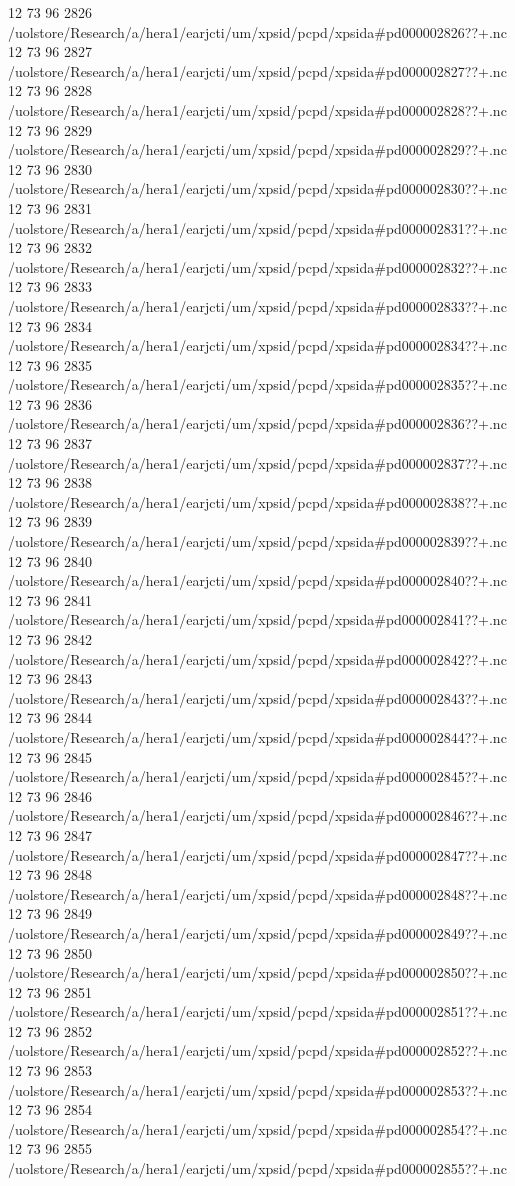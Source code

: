 12 73 96
2826
/uolstore/Research/a/hera1/earjcti/um/xpsid/pcpd/xpsida#pd000002826??+.nc
12 73 96
2827
/uolstore/Research/a/hera1/earjcti/um/xpsid/pcpd/xpsida#pd000002827??+.nc
12 73 96
2828
/uolstore/Research/a/hera1/earjcti/um/xpsid/pcpd/xpsida#pd000002828??+.nc
12 73 96
2829
/uolstore/Research/a/hera1/earjcti/um/xpsid/pcpd/xpsida#pd000002829??+.nc
12 73 96
2830
/uolstore/Research/a/hera1/earjcti/um/xpsid/pcpd/xpsida#pd000002830??+.nc
12 73 96
2831
/uolstore/Research/a/hera1/earjcti/um/xpsid/pcpd/xpsida#pd000002831??+.nc
12 73 96
2832
/uolstore/Research/a/hera1/earjcti/um/xpsid/pcpd/xpsida#pd000002832??+.nc
12 73 96
2833
/uolstore/Research/a/hera1/earjcti/um/xpsid/pcpd/xpsida#pd000002833??+.nc
12 73 96
2834
/uolstore/Research/a/hera1/earjcti/um/xpsid/pcpd/xpsida#pd000002834??+.nc
12 73 96
2835
/uolstore/Research/a/hera1/earjcti/um/xpsid/pcpd/xpsida#pd000002835??+.nc
12 73 96
2836
/uolstore/Research/a/hera1/earjcti/um/xpsid/pcpd/xpsida#pd000002836??+.nc
12 73 96
2837
/uolstore/Research/a/hera1/earjcti/um/xpsid/pcpd/xpsida#pd000002837??+.nc
12 73 96
2838
/uolstore/Research/a/hera1/earjcti/um/xpsid/pcpd/xpsida#pd000002838??+.nc
12 73 96
2839
/uolstore/Research/a/hera1/earjcti/um/xpsid/pcpd/xpsida#pd000002839??+.nc
12 73 96
2840
/uolstore/Research/a/hera1/earjcti/um/xpsid/pcpd/xpsida#pd000002840??+.nc
12 73 96
2841
/uolstore/Research/a/hera1/earjcti/um/xpsid/pcpd/xpsida#pd000002841??+.nc
12 73 96
2842
/uolstore/Research/a/hera1/earjcti/um/xpsid/pcpd/xpsida#pd000002842??+.nc
12 73 96
2843
/uolstore/Research/a/hera1/earjcti/um/xpsid/pcpd/xpsida#pd000002843??+.nc
12 73 96
2844
/uolstore/Research/a/hera1/earjcti/um/xpsid/pcpd/xpsida#pd000002844??+.nc
12 73 96
2845
/uolstore/Research/a/hera1/earjcti/um/xpsid/pcpd/xpsida#pd000002845??+.nc
12 73 96
2846
/uolstore/Research/a/hera1/earjcti/um/xpsid/pcpd/xpsida#pd000002846??+.nc
12 73 96
2847
/uolstore/Research/a/hera1/earjcti/um/xpsid/pcpd/xpsida#pd000002847??+.nc
12 73 96
2848
/uolstore/Research/a/hera1/earjcti/um/xpsid/pcpd/xpsida#pd000002848??+.nc
12 73 96
2849
/uolstore/Research/a/hera1/earjcti/um/xpsid/pcpd/xpsida#pd000002849??+.nc
12 73 96
2850
/uolstore/Research/a/hera1/earjcti/um/xpsid/pcpd/xpsida#pd000002850??+.nc
12 73 96
2851
/uolstore/Research/a/hera1/earjcti/um/xpsid/pcpd/xpsida#pd000002851??+.nc
12 73 96
2852
/uolstore/Research/a/hera1/earjcti/um/xpsid/pcpd/xpsida#pd000002852??+.nc
12 73 96
2853
/uolstore/Research/a/hera1/earjcti/um/xpsid/pcpd/xpsida#pd000002853??+.nc
12 73 96
2854
/uolstore/Research/a/hera1/earjcti/um/xpsid/pcpd/xpsida#pd000002854??+.nc
12 73 96
2855
/uolstore/Research/a/hera1/earjcti/um/xpsid/pcpd/xpsida#pd000002855??+.nc
